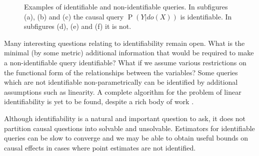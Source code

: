 \documentclass[11pt,a4paper,oneside]{book}
\renewcommand{\P}[1]{\operatorname{P}\left(#1\right)}
\theoremstyle{plain}
\theoremstyle{definition}
\begin{document}
\begin{figure}[h]
\begin{subfigure}[t]{0.29\textwidth}
\centering
\vspace*{.5cm}
\caption{}
\label{fig:nid2_instrumental_variable}
\end{subfigure}
\begin{subfigure}[t]{0.29\textwidth}
\centering
\vspace*{.5cm}
\caption{}
\label{fig:nid3}
\end{subfigure}
\caption{Examples of identifiable and non-identifiable queries. In subfigures (a), (b) and (c) the causal query $\P{Y|do(X)}$ is identifiable. In subfigures (d), (e) and (f) it is not.}
\label{fig:identify}
\end{figure}


Many interesting questions relating to identifiability remain open. What is the minimal (by some metric) additional information that would be required to make a non-identifiable query identifiable? What if we assume various restrictions on the functional form of the relationships between the variables? Some queries which are not identifiable non-parametrically can be identified by additional assumptions such as linearity. A complete algorithm for the problem of linear identifiability is yet to be found, despite a rich body of work \citep{Chen2016,tian2009parameter,drton2011global}.

Although identifiability is a natural and important question to ask, it does not partition causal questions into solvable and unsolvable. Estimators for identifiable queries can be slow to converge and we may be able to obtain useful bounds on causal effects in cases where point estimates are not identified.
\end{document}

